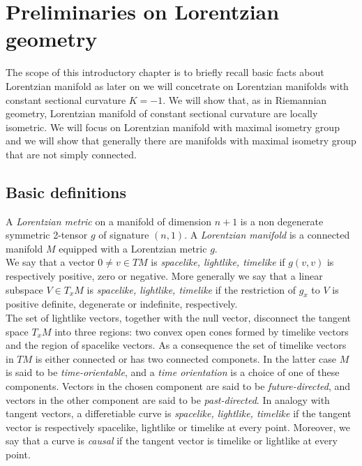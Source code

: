 \chapter{Preliminaries on Lorentzian geometry}

The scope of this introductory chapter is to briefly recall basic facts about Lorentzian manifold as later on we will concetrate on Lorentzian manifolds with constant sectional curvature $K=-1$.
We will show that, as in Riemannian geometry, Lorentzian manifold of constant sectional curvature are locally isometric. We will focus on Lorentzian manifold with maximal isometry group and we will show that generally there are manifolds with maximal isometry group that are not simply connected.
\section{Basic definitions}
A \textit{Lorentzian metric} on a manifold of dimension $n+1$ is a non degenerate symmetric 2-tensor $g$ of signature $(n,1)$.
A \textit{Lorentzian manifold} is a connected manifold $M$ equipped with a Lorentzian metric $g$.\\
We say that a vector $0\neq v \in TM$ is \textit{spacelike, lightlike, timelike} if $g(v,v)$ is respectively positive, zero or negative.
More generally we say that a linear subspace $V \in T_x M$ is \textit{spacelike, lightlike, timelike} if the restriction of $g_x$ to $V$ is positive definite, degenerate or indefinite, respectively.\\
The set of lightlike vectors, together with the null vector, disconnect the tangent space $T_x M$ into three regions: two convex open cones formed by timelike vectors and the region of spacelike vectors.
As a consequence the set of timelike vectors in $TM$ is either connected or has two connected componets.
In the latter case $M$ is said to be \textit{time-orientable}, and a \textit{time orientation} is a choice of one of these components.
Vectors in the chosen component are said to be \textit{future-directed}, and vectors in the other component are said to be \textit{past-directed}.
In analogy with tangent vectors, a differetiable curve is \textit{spacelike, lightlike, timelike} if the tangent vector is respectively spacelike, lightlike or timelike at every point. Moreover, we say that a curve is \textit{causal} if the tangent vector is timelike or lightlike at every point.\\

